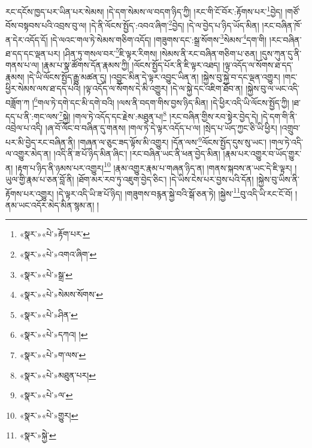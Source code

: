 རང་དངོས་ཁྱད་པར་ཡིན་པར་སེམས། །དེ་དག་སེམས་ལ་བདག་ཉིད་ཀྱི། །རང་གི་ངོ་བོར་:རྟོགས་པར་\footnote{«སྣར་»«པེ་»རྟོག་པར་}བྱེད། །གཙོ་བོས་བསྟབས་པའི་འབྲས་བུ་ལ། །དེ་ནི་ལོངས་སྤྱོད་:འབའ་ཞིག་\footnote{«སྣར་»«པེ་»འགའ་ཞིག་}བྱེད། །དེ་ལ་བྱེད་པ་ཉིད་ཡོད་མིན། །རང་བཞིན་ཁོ་ན་དེར་འདོད་དོ། །དེ་ལའང་གལ་ཏེ་སེམས་གཅིག་འདོད། །གཟུགས་དང་:སྒྲ་སོགས་\footnote{«སྣར་»«པེ་»སྒྲ་}སེམས་\footnote{«སྣར་»«པེ་»སེམས་སོགས་}དག་གི། །རང་བཞིན་ཐ་དད་དང་ལྡན་པར། །ཤིན་ཏུ་གསལ་བར་\footnote{«སྣར་»«པེ་»ཤིན་}ཇི་ལྟར་རིགས། །སེམས་ནི་རང་བཞིན་གཅིག་པ་ཅན། །དུས་ཀུན་དུ་ནི་གནས་པ་ལ། །རྣམ་པ་སྣ་ཚོགས་དོན་རྣམས་ཀྱི། །ལོངས་སྤྱོད་པོར་ནི་ཇི་ལྟར་འཐད། །ལྟ་འདོད་ལ་སོགས་ཐ་དད་རྣམས། །དེ་ཡི་ལོངས་སྤྱོད་རྒྱུ་མཚན་དུ། །འབྱུང་མིན་དེ་ལྟར་འབྱུང་ཡིན་ན། །སྐྱེས་བུ་སྐྱེ་བ་དང་ལྡན་འགྱུར། །གང་ཕྱིར་སེམས་ལས་ཐ་དད་པའི། །ལྟ་འདོད་ལ་སོགས་དེ་མི་འགྱུར། །དེ་ལ་སྐྱེ་དང་འཇིག་ཐོབ་ན། །སྐྱེས་བུ་ལ་ཡང་འདི་བཟློག་ཀ །\footnote{«སྣར་»«པེ་»དཀའ། །}གལ་ཏེ་དགེ་དང་མི་དགེ་བའི། །ལས་ནི་བདག་གིས་བྱས་ཉིད་མིན། །དེ་ཕྱིར་འདི་ཡི་ལོངས་སྤྱོད་ཀྱི། །ཐ་དད་པ་ནི་:གང་ལས་\footnote{«སྣར་»«པེ་»ག་ལས་}སྐྱེ། །གལ་ཏེ་འདོད་དང་རྗེས་:མཐུན་པ།\footnote{«སྣར་»«པེ་»མཐུན་པར།} །རང་བཞིན་གྱིས་རབ་སྟེར་བྱེད་དེ། །དེ་དག་གི་ནི་འབྲེལ་པ་འདི། །ཞ་བོ་ལོང་བ་བཞིན་དུ་གནས། །གལ་ཏེ་དེ་ལྟར་འདོད་པ་ལ། །སྲེད་པ་ཡོད་ཀྱང་ཅི་ཡི་ཕྱིར། །འགྲུབ་པར་མི་བྱེད་རང་བཞིན་ནི། །གཞན་ལ་ཅུང་ཟད་ལྟོས་མི་འགྱུར། །དོན་ལས་\footnote{«སྣར་»«པེ་»ལ་}ལོངས་སྤྱོད་དུས་སུ་ཡང་། །གལ་ཏེ་འདི་ལ་འགྱུར་མེད་ན། །འདི་ནི་ཟ་པོ་ཉིད་མིན་ཞིང་། །རང་བཞིན་ཡང་ནི་ཕན་བྱེད་མིན། །རྣམ་པར་འགྱུར་བ་ཡོད་གྱུར་ན། །རྟག་པ་ཉིད་ནི་ཉམས་པར་འགྱུར།\footnote{«སྣར་»«པེ་»གྱུར།} །རྣམ་འགྱུར་རྣམ་པ་གཞན་ཉིད་ན། །གནས་སྐབས་ན་ཡང་དེ་ཇི་ལྟར། །ཡུལ་གྱི་རྣམ་པ་ཅན་བློ་ནི། །ཐོག་མར་རབ་ཏུ་འཇུག་བྱེད་ཅིང་། །དེ་ཡིས་ངེས་པར་བྱས་པའི་དོན། །སྐྱེས་བུ་ཡིས་ནི་རྟོགས་པར་འགྱུར། །དེ་ལྟར་འདི་ཡི་ཟ་པོ་ཉིད། །གཟུགས་བརྙན་སྐྱེ་བའི་སྒོ་ཅན་ཏེ། །སྐྱེས་\footnote{«སྣར་»སྐྱེ་}བུ་འདི་ཡི་རང་ངོ་བོ། །ནམ་ཡང་འདོར་མེད་མིན་སྙམ་ན། །
